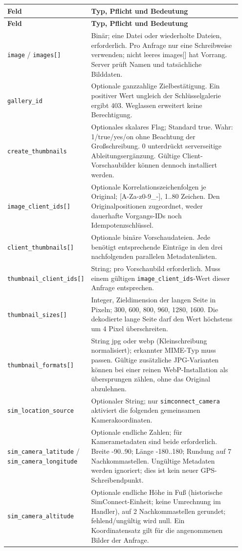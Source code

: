 \documentclass[11pt,a4paper]{article}
\newcommand{\codeword}[1]{\nolinkurl{#1}}
\begin{document}
\begin{longtable}{@{}>{\RaggedRight\arraybackslash}p{0.28\linewidth}>{\RaggedRight\arraybackslash}p{0.67\linewidth}@{}}
\toprule
\textbf{Feld} & \textbf{Typ, Pflicht und Bedeutung} \\
\midrule
\endfirsthead
\toprule
\textbf{Feld} & \textbf{Typ, Pflicht und Bedeutung} \\
\midrule
\endhead
\bottomrule
\endfoot
\codeword{image} / \codeword{images[]} & Binär; eine Datei oder wiederholte Dateien,
erforderlich. Pro Anfrage nur eine Schreibweise verwenden; nicht leeres images[] hat
Vorrang. Server prüft Namen und tatsächliche Bilddaten. \\
\codeword{gallery_id} & Optionale ganzzahlige Zielbestätigung. Ein positiver Wert ungleich
der Schlüsselgalerie ergibt 403. Weglassen erweitert keine Berechtigung. \\
\codeword{create_thumbnails} & Optionales skalares Flag; Standard true. Wahr: 1/true/yes/on
ohne Beachtung der Großschreibung. 0 unterdrückt serverseitige Ableitungsergänzung. Gültige
Client-Vorschaubilder können dennoch installiert werden. \\
\codeword{image_client_ids[]} & Optionale Korrelationszeichenfolgen je Original;
[A-Za-z0-9\_-], 1..80 Zeichen. Den Originalpositionen zugeordnet, weder dauerhafte
Vorgangs-IDs noch Idempotenzschlüssel. \\
\codeword{client_thumbnails[]} & Optionale binäre Vorschaudateien. Jede benötigt
entsprechende Einträge in den drei nachfolgenden parallelen Metadatenlisten. \\
\codeword{thumbnail_client_ids[]} & String; pro Vorschaubild erforderlich. Muss einem
gültigen \codeword{image_client_ids}-Wert dieser Anfrage entsprechen. \\
\codeword{thumbnail_sizes[]} & Integer, Zieldimension der langen Seite in Pixeln; 300, 600,
800, 960, 1280, 1600. Die dekodierte lange Seite darf den Wert höchstens um 4 Pixel
überschreiten. \\
\codeword{thumbnail_formats[]} & String jpg oder webp (Kleinschreibung normalisiert);
erkannter MIME-Typ muss passen. Gültige zusätzliche JPG-Varianten können bei einer reinen
WebP-Installation als übersprungen zählen, ohne das Original abzulehnen. \\
\codeword{sim_location_source} & Optionaler String; nur \codeword{simconnect_camera}
aktiviert die folgenden gemeinsamen Kamerakoordinaten. \\
\codeword{sim_camera_latitude} / \codeword{sim_camera_longitude} & Optionale endliche
Zahlen; für Kamerametadaten sind beide erforderlich. Breite -90..90; Länge -180..180;
Rundung auf 7 Nachkommastellen. Ungültige Metadaten werden ignoriert; dies ist kein neuer
GPS-Schreibendpunkt. \\
\codeword{sim_camera_altitude} & Optionale endliche Höhe in Fuß (historische
SimConnect-Einheit; keine Umrechnung im Handler), auf 2 Nachkommastellen gerundet;
fehlend/ungültig wird null. Ein Koordinatensatz gilt für die angenommenen Bilder der
Anfrage. \\
\end{longtable}
\end{document}
